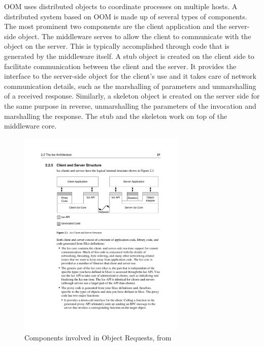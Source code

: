 \documentclass{acm_proc_article-sp}
\begin{document}
OOM uses distributed objects to coordinate processes on multiple hosts.  A distributed system based on OOM is made up of several types of components.  The most prominent two components are the client application and the server-side object.  The middleware serves to allow the client to communicate with the object on the server.  This is typically accomplished through code that is generated by the middleware itself.  A stub object is created on the client side to facilitate communication between the client and the server.  It provides the interface to the server-side object for the client's use and it takes care of network communication details, such as the marshalling of parameters and unmarshalling of a received response.  Similarly, a skeleton object is created on the server side for the same purpose in reverse, unmarshalling the parameters of the invocation and marshalling the response.  The stub and the skeleton work on top of the middleware core.


\begin{figure}
\centering
\includegraphics[width=8cm]{icefig21.pdf}
\caption{Components involved in Object Requests, from \cite{icemanual}}
\label{fig:icefig21}
\end{figure}
\end{document}
